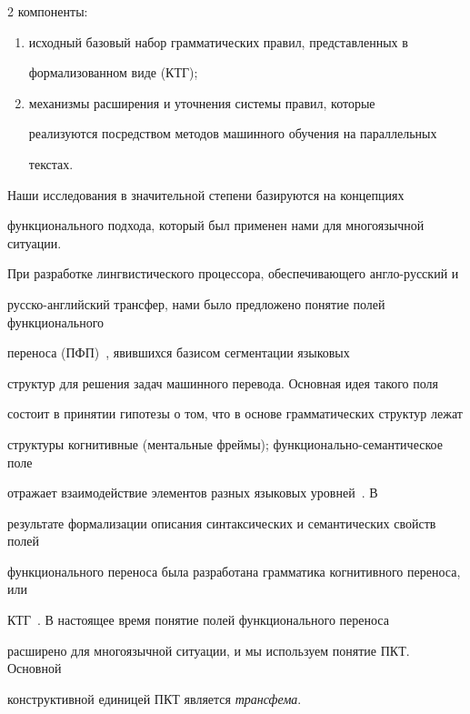 \begin{multicols}{2}
компоненты:


\begin{enumerate}[(1)]


\item исходный базовый набор грамматических правил, представленных в


формализованном виде (КТГ);


\item механизмы расширения и уточнения системы правил, которые


реализуются посредством методов машинного обучения на параллельных


текстах.


\end{enumerate}





Наши исследования в значительной степени базируются на концепциях


функционального подхода, который был применен нами для многоязычной ситуации. 


При разработке лингвистического процессора, обеспечивающего англо-русский и 


русско-английский трансфер, нами было предложено понятие полей функционального 


переноса (ПФП)~\cite{11koz, 12koz}, явившихся базисом сегментации языковых 


структур для решения задач машинного перевода. Основная идея такого поля 


состоит в принятии гипотезы о том, что в основе грамматических структур лежат 


структуры когнитивные (ментальные фреймы); функционально-семантическое поле 


отражает взаимодействие элементов разных языковых уровней~\cite{12koz}. В 


результате формализации описания синтаксических и семантических свойств полей 


функционального переноса была разработана грамматика когнитивного переноса, или 


КТГ~\cite{11koz}. В настоящее время понятие  полей функционального переноса 


расширено для многоязычной ситуации, и мы используем понятие ПКТ. Основной 


конструктивной единицей ПКТ является \textit{трансфема}. 


{





}
\end{multicols}
